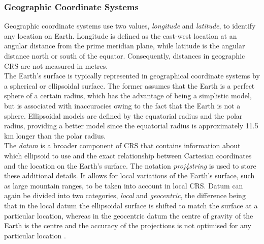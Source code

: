 \subsubsection*{Geographic Coordinate Systems}
Geographic coordinate systems use two values, \textit{longitude} and \textit{latitude}, to identify any location on Earth. Longitude is defined as the east-west location at an angular distance from the prime meridian plane, while latitude is the angular distance north or south of the equator. Consequently, distances in geographic CRS are not measured in metres. \\
The Earth's surface is typically represented in geographical coordinate systems by a spherical or ellipsoidal surface. The former assumes that the Earth is a perfect sphere of a certain radius, which has the advantage of being a simplistic model, but is associated with inaccuracies owing to the fact that the Earth is not a sphere. Ellipsoidal models are defined by the equatorial radius and the polar radius, providing a better model since the equatorial radius is approximately 11.5 km longer than the polar radius.\\
The \textit{datum} is a broader component of CRS that contains information about which ellipsoid to use and the exact relationship between Cartesian coordinates and the location on the Earth's surface. The notation \textit{proj4string} is used to store these additional details. It allows for local variations of the Earth's surface, such as large mountain ranges, to be taken into account in local CRS. Datum can again be divided into two categories, \textit{local} and \textit{geocentric}, the difference being that in the local datum the ellipsoidal surface is shifted to match the surface at a particular location, whereas in the geocentric datum the centre of gravity of the Earth is the centre and the accuracy of the projections is not optimised for any particular location \autocite[][]{lovelace2019geocomputation}.
